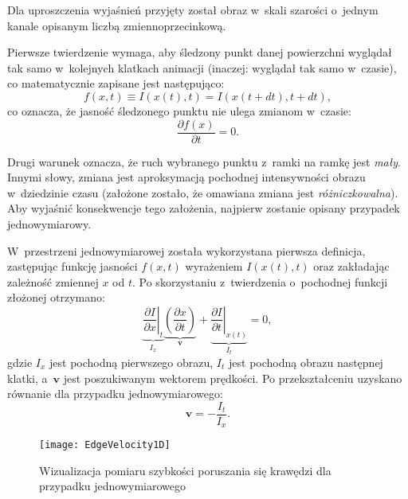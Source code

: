       Dla uproszczenia wyjaśnień przyjęty został obraz w~skali szarości o~jednym kanale opisanym liczbą zmiennoprzecinkową.

      Pierwsze twierdzenie wymaga, aby śledzony punkt danej powierzchni wyglądał tak samo w~kolejnych klatkach animacji (inaczej: wyglądał tak samo w~czasie), co matematycznie zapisane jest następująco:
      \begin{equation}
        f(x, t) \equiv I(x(t), t) = I(x(t + dt), t + dt),
      \end{equation}
      co oznacza, że jasność śledzonego punktu nie ulega zmianom w~czasie:
      \begin{equation}
        \frac{\partial f(x)}{\partial t} = 0.
      \end{equation}

      Drugi warunek oznacza, że ruch wybranego punktu z~ramki na ramkę jest \textit{mały}. Innymi słowy, zmiana jest aproksymacją pochodnej intensywności obrazu w~dziedzinie czasu (założone zostało, że omawiana zmiana jest \textit{różniczkowalna}). Aby wyjaśnić konsekwencje tego założenia, najpierw zostanie opisany przypadek jednowymiarowy.

      W~przestrzeni jednowymiarowej została wykorzystana pierwsza definicja, zastępując funkcję jasności $f(x,t)$ wyrażeniem $I(x(t), t)$ oraz zakładając zależność zmiennej $x$ od $t$. Po skorzystaniu z~twierdzenia o~pochodnej funkcji złożonej otrzymano:
      \begin{equation}
        \underbrace{ \left. \frac{\partial I}{\partial x}\right|_{t} }_{I_{x}} \underbrace{ \left(\frac{\partial x}{\partial t}\right) }_{\mathbf{v}} + \underbrace{ \left. \frac{\partial I}{\partial t}\right|_{x(t)} }_{I_{t}} = 0,
      \end{equation}
      gdzie $I_{x}$ jest pochodną pierwszego obrazu, $I_{t}$ jest pochodną obrazu następnej klatki, a~$\mathbf{v}$ jest poszukiwanym wektorem prędkości. Po przekształceniu uzyskano równanie dla przypadku jednowymiarowego:
      \begin{equation}
        \mathbf{v} = -\frac{I_{t}}{I_{x}}.
      \end{equation}

      \newpage
        \begin{figure}[!ht]
          \centering
          \texttt{[image: EdgeVelocity1D]}
          \caption[Wizualizacja pomiaru szybkości poruszania się krawędzi dla przypadku jednowymiarowego]{Wizualizacja pomiaru szybkości poruszania się krawędzi dla przypadku jednowymiarowego}
          \label{fig:EdgeVelocity1D}
        \end{figure}

